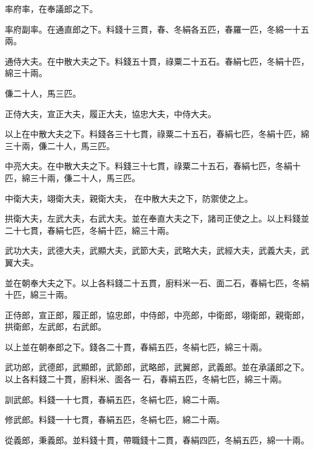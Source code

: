 \begin{pinyinscope}
 率府率，在奉議郎之下。



 率府副率。在通直郎之下。料錢十三貫，春、冬絹各五匹，春羅一匹，冬綿一十五兩。



 通侍大夫。在中散大夫之下。料錢五十貫，祿粟二十五石。春絹七匹，冬絹十匹，綿三十兩。



 傔二十人，馬三匹。



 正侍大夫，宣正大夫，履正大夫，協忠大夫，中侍大夫。



 以上在中散大夫之下。料錢各三十七貫，祿粟二十五石，春絹七匹，冬絹十匹，綿三十兩，傔二十人，馬三匹。



 中亮大夫。在中散大夫之下。料錢三十七貫，祿粟二十五石，春絹七匹，冬絹十匹，綿三十兩，傔二十人，馬三匹。



 中衛大夫，翊衛大夫，親衛大夫，
 在中散大夫之下，防禦使之上。



 拱衛大夫，左武大夫，右武大夫。並在奉直大夫之下，諸司正使之上。以上料錢並二十七貫，春絹七匹，冬絹十匹，綿三十兩。



 武功大夫，武德大夫，武顯大夫，武節大夫，武略大夫，武經大夫，武義大夫，武翼大夫。



 並在朝奉大夫之下。以上各料錢二十五貫，廚料米一石、面二石，春絹七匹，冬絹十匹，綿三十兩。



 正侍郎，宣正郎，履正郎，協忠郎，中侍郎，中亮郎，中衛郎，翊衛郎，親衛郎，拱衛郎，左武郎，右武郎。



 以上並在朝奉郎之下。錢各二十貫，春絹五匹，冬絹七匹，綿三十兩。



 武功郎，武德郎，武顯郎，武節郎，武略郎，武翼郎，武義郎。並在承議郎之下。以上各料錢二十貫，廚料米、面各一
 石，春絹五匹，冬絹七匹，綿三十兩。



 訓武郎。料錢一十七貫，春絹五匹，冬絹七匹，綿二十兩。



 修武郎。料錢一十七貫，春絹五匹，冬絹七匹，綿二十兩。



 從義郎，秉義郎。並料錢十貫，帶職錢十二貫，春絹四匹，冬絹五匹，綿一十兩。




\end{pinyinscope}

